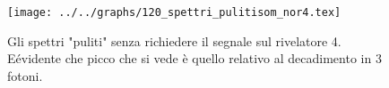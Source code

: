 \begin{figure}[h] \centering\texttt{[image: ../../graphs/120\_spettri\_pulitisom\_nor4.tex]}\caption{Gli spettri "puliti" senza richiedere il segnale sul rivelatore 4. E\' evidente che picco che si vede è quello relativo al decadimento in 3 fotoni.}\label{gr:120_spettri_pulitisom_nor4} \end{figure}
